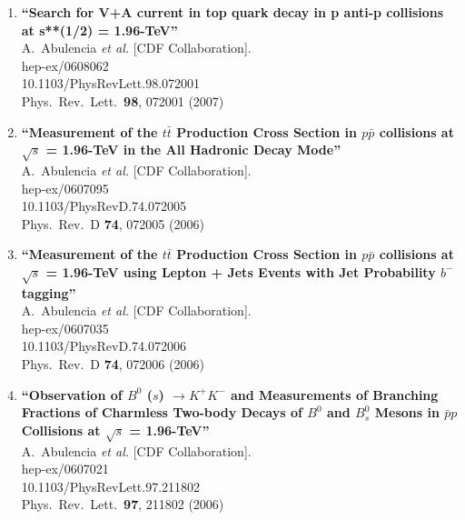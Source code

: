 \documentclass{article}
\begin{document}
\begin{enumerate}
\item%
{\bf ``Search for V+A current in top quark decay in p anti-p collisions at s**(1/2) = 1.96-TeV''}
  \\{}A.~Abulencia {\it et al.}  [CDF Collaboration].
  \\{}hep-ex/0608062
    \\{}10.1103/PhysRevLett.98.072001
\\{}Phys.\ Rev.\ Lett.\  {\bf 98}, 072001 (2007) %


\item%
{\bf ``Measurement of the $t \bar{t}$ Production Cross Section in $p \bar{p}$ collisions at $\sqrt{s}$ = 1.96-TeV in the All Hadronic Decay Mode''}
  \\{}A.~Abulencia {\it et al.}  [CDF Collaboration].
  \\{}hep-ex/0607095
    \\{}10.1103/PhysRevD.74.072005
\\{}Phys.\ Rev.\ D {\bf 74}, 072005 (2006) %


\item%
{\bf ``Measurement of the $t \bar{t}$ Production Cross Section in $p \bar{p}$ collisions at $\sqrt{s}$ = 1.96-TeV using Lepton + Jets Events with Jet Probability $b^-$ tagging''}
  \\{}A.~Abulencia {\it et al.}  [CDF Collaboration].
  \\{}hep-ex/0607035
    \\{}10.1103/PhysRevD.74.072006
\\{}Phys.\ Rev.\ D {\bf 74}, 072006 (2006) %


\item%
{\bf ``Observation of $B^0$ ($s$) $\to K^{+} K^{-}$ and Measurements of Branching Fractions of Charmless Two-body Decays of $B^0$ and $B^0_{s}$ Mesons in $\bar{p} p$ Collisions at $\sqrt{s}$ = 1.96-TeV''}
  \\{}A.~Abulencia {\it et al.}  [CDF Collaboration].
  \\{}hep-ex/0607021
    \\{}10.1103/PhysRevLett.97.211802
\\{}Phys.\ Rev.\ Lett.\  {\bf 97}, 211802 (2006) %



\end{enumerate}
\end{document}
